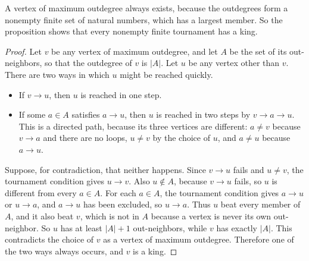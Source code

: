 A vertex of maximum outdegree always exists, because the outdegrees form a nonempty finite set of natural numbers, which has a largest member. So the proposition shows that every nonempty finite tournament has a king.

\begin{proof}
Let $v$ be any vertex of maximum outdegree, and let $A$ be the set of its out-neighbors, so that the outdegree of $v$ is $|A|$. Let $u$ be any vertex other than $v$. There are two ways in which $u$ might be reached quickly.
\begin{itemize}
\item If $v\to u$, then $u$ is reached in one step.
\item If some $a\in A$ satisfies $a\to u$, then $u$ is reached in two steps by $v\to a\to u$. This is a directed path, because its three vertices are different: $a\ne v$ because $v\to a$ and there are no loops, $u\ne v$ by the choice of $u$, and $a\ne u$ because $a\to u$.
\end{itemize}
Suppose, for contradiction, that neither happens. Since $v\to u$ fails and $u\ne v$, the tournament condition gives $u\to v$. Also $u\notin A$, because $v\to u$ fails, so $u$ is different from every $a\in A$. For each $a\in A$, the tournament condition gives $a\to u$ or $u\to a$, and $a\to u$ has been excluded, so $u\to a$. Thus $u$ beat every member of $A$, and it also beat $v$, which is not in $A$ because a vertex is never its own out-neighbor. So $u$ has at least $|A|+1$ out-neighbors, while $v$ has exactly $|A|$. This contradicts the choice of $v$ as a vertex of maximum outdegree. Therefore one of the two ways always occurs, and $v$ is a king.
\end{proof}

